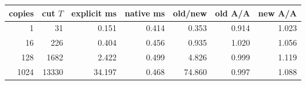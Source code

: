 \begin{center}
\begin{tabular}{rrrrrrr}
\toprule
copies & cut $T$ & explicit ms & native ms & old/new & old A/A & new A/A\\
\midrule
1 & 31 & 0.151 & 0.414 & 0.353 & 0.914 & 1.023\\
16 & 226 & 0.404 & 0.456 & 0.935 & 1.020 & 1.056\\
128 & 1682 & 2.422 & 0.499 & 4.826 & 0.999 & 1.119\\
1024 & 13330 & 34.197 & 0.468 & 74.860 & 0.997 & 1.088\\
\bottomrule
\end{tabular}
\end{center}
